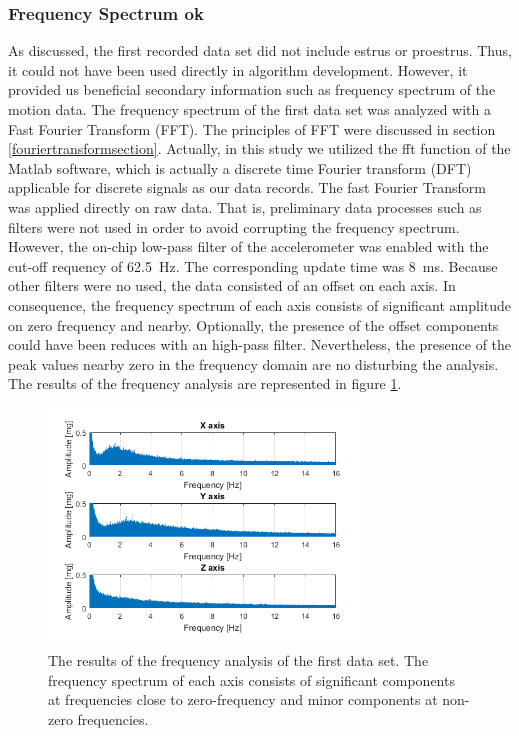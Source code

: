 \documentclass[english,12pt,a4paper,pdftex,elec,utf8]{aaltothesis}
\begin{document}
\subsubsection{Frequency Spectrum ok}

As discussed, the first recorded data set did not include estrus or proestrus. Thus, it could not have been used directly in algorithm development. However, it provided us beneficial secondary information such as frequency spectrum of the motion data. The frequency spectrum of the first data set was analyzed with a Fast Fourier Transform (FFT). The principles of FFT were discussed in section \ref{fouriertransformsection}. Actually, in this study we utilized the fft function of the Matlab software, which is actually a discrete time Fourier transform (DFT) applicable for discrete signals as our data records. The fast Fourier Transform was applied directly on raw data. That is, preliminary data processes such as filters were not used in order to avoid corrupting the frequency spectrum. However, the on-chip low-pass filter of the accelerometer was enabled with the cut-off requency of \SI{62.5}{\hertz}. The corresponding update time was \SI{8}{\milli\second}. Because other filters were no used, the data consisted of an offset on each axis. In consequence, the frequency spectrum of each axis consists of significant amplitude on zero frequency and nearby. Optionally, the presence of the offset components could have been reduces with an high-pass filter. Nevertheless, the presence of the peak values nearby zero in the frequency domain are no disturbing the analysis. The results of the frequency analysis are represented in figure \ref{frequenyspectrumfigure}. 


\begin{figure}[h]
\centering
\includegraphics[width = 0.75\textwidth]{figures/frequencyanalysis2.png}
\caption{The results of the frequency analysis of the first data set. The frequency spectrum of each axis consists of significant components at frequencies close to zero-frequency and minor components at non-zero frequencies.} \label{frequenyspectrumfigure}
\end{figure}
\end{document}
